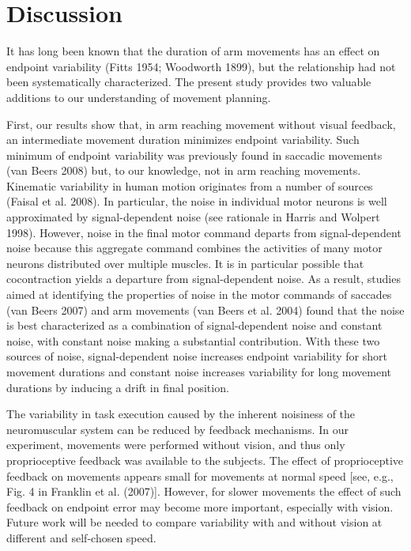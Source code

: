 \section{Discussion}

It has long been known that the duration of arm movements
has an effect on endpoint variability (Fitts 1954; Woodworth 1899), but the relationship had not been systematically characterized. The present study provides two valuable additions to our understanding of movement planning.

First, our results show that, in arm reaching movement
without visual feedback, an intermediate movement duration minimizes endpoint variability. Such minimum of endpoint variability was previously found in saccadic movements (van Beers 2008) but, to our knowledge, not in arm reaching movements. Kinematic variability in human motion originates from a number of sources (Faisal et al. 2008). In particular, the noise in individual motor neurons is well approximated by signal-dependent noise (see rationale in Harris and Wolpert 1998). However, noise in the final motor command departs from signal-dependent noise because this aggregate command combines the activities of many motor neurons distributed over multiple muscles. It is in particular possible that cocontraction yields a departure from signal-dependent noise. As a result, studies aimed at identifying the properties of noise in the motor commands of saccades (van Beers 2007) and arm movements (van Beers et al. 2004) found that the noise is best characterized as a combination of signal-dependent noise and constant noise, with constant noise making a substantial contribution. With these two sources of noise, signal-dependent noise increases endpoint variability for short movement durations and constant noise increases variability for long movement durations by inducing a drift in final position.

The variability in task execution caused by the inherent noisiness of the neuromuscular system can be reduced by feedback mechanisms. In our experiment, movements were performed without vision, and thus only proprioceptive feedback was available to the subjects. The effect of proprioceptive feedback on movements appears small for movements at normal speed [see, e.g., Fig. 4 in Franklin et al. (2007)]. However, for slower movements the effect of such feedback on endpoint error may become more important, especially with vision. Future work will be needed to compare variability with and without vision at different and self-chosen speed.

